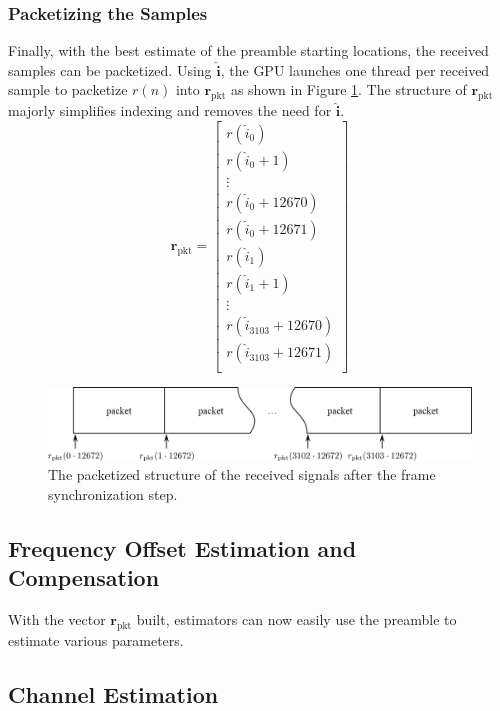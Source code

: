 \clearpage
\subsubsection{Packetizing the Samples}
Finally, with the best estimate of the preamble starting locations, the received samples can be packetized.
Using $\hat{\mathbf{i}}$, the GPU launches one thread per received sample to packetize $r(n)$ into $\mathbf{r}_\text{pkt}$ as shown in Figure \ref{fig:packetized}. 
The structure of $\mathbf{r}_\text{pkt}$ majorly simplifies indexing and removes the need for $\hat{\mathbf{i}}$.
\begin{equation}
\mathbf{r}_\text{pkt} = 
\begin{bmatrix}
r(\hat{i}_0) 			\\
r(\hat{i}_0+1) 		\\
\vdots			\\
r(\hat{i}_0+12670)\\
r(\hat{i}_0+12671)\\
r(\hat{i}_1) 			\\
r(\hat{i}_1+1) 		\\
\vdots			\\
r(\hat{i}_{3103}+12670)\\
r(\hat{i}_{3103}+12671)\\
\end{bmatrix}
\end{equation}
\begin{figure}
	\centering\includegraphics[width=\textwidth/10*9]{figures/gpu/packetized.png}
	\caption{The packetized structure of the received signals after the frame synchronization step.}
	\label{fig:packetized}
\end{figure}

\subsection{Frequency Offset Estimation and Compensation}
\label{sec:frequency_offset_estimation_and_compensation}
With the vector $\mathbf{r}_\text{pkt}$ built, estimators can now easily use the preamble to estimate various parameters.

\subsection{Channel Estimation}
\label{sec:channel_estimation}

